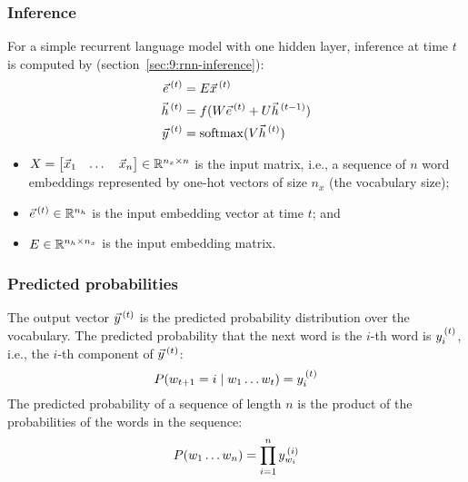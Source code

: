 \subsubsection{Inference}
\label{sec:9:rnn-lm-inference}

For a simple recurrent language model with one hidden layer, inference at time
$t$ is computed by (section~\ref{sec:9:rnn-inference}):
\begin{align}
  \vec{e}^{\,(t)} & = E \vec{x}^{\,(t)}                                       \\
  \vec{h}^{\,(t)} & = f(W \vec{e}^{\,(t)} + U \vec{h}^{\,(t - 1)}) \\
  \vec{y}^{\,(t)} & = \operatorname{softmax}(V \vec{h}^{\,(t)})
\end{align}
\begin{itemize}
  \item $X = \begin{bmatrix} \vec{x}_1 & \dots & \vec{x}_n \end{bmatrix}
          \in \mathbb{R}^{n_x \times n}$ is the input matrix, i.e., a sequence
        of $n$ word embeddings represented by one-hot vectors of size $n_x$ (the
        vocabulary size);
  \item $\vec{e}^{\,(t)} \in \mathbb{R}^{n_h}$ is the input embedding vector at time $t$; and
  \item $E \in \mathbb{R}^{n_h \times n_x}$ is the input embedding matrix.
\end{itemize}

\subsubsection{Predicted probabilities}

The output vector $\vec{y}^{\,(t)}$ is the predicted probability
distribution over the vocabulary.
The predicted probability that the next word is the $i$-th word is
$y_i^{\,(t)}$, i.e., the $i$-th component of $\vec{y}^{\,(t)}$:
\begin{equation}
  P(w_{t + 1} = i \mid w_{1} \dots w_t) = y_i^{\,(t)}
\end{equation}
The predicted probability of a sequence of length $n$ is the product of the
probabilities of the words in the sequence:
\begin{equation}
  P(w_{1} \dots w_{n}) = \prod_{i = 1}^n y_{w_i}^{\,(i)}
\end{equation}


